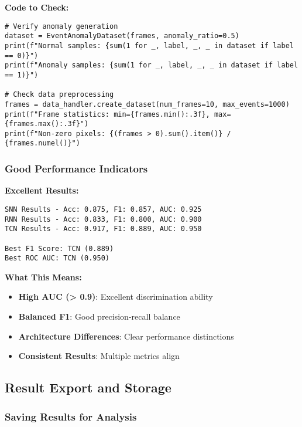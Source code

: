 \documentclass[12pt,a4paper]{article}
\begin{document}
\textbf{Code to Check:}
\begin{lstlisting}
# Verify anomaly generation
dataset = EventAnomalyDataset(frames, anomaly_ratio=0.5)
print(f"Normal samples: {sum(1 for _, label, _, _ in dataset if label == 0)}")
print(f"Anomaly samples: {sum(1 for _, label, _, _ in dataset if label == 1)}")

# Check data preprocessing
frames = data_handler.create_dataset(num_frames=10, max_events=1000)
print(f"Frame statistics: min={frames.min():.3f}, max={frames.max():.3f}")
print(f"Non-zero pixels: {(frames > 0).sum().item()} / {frames.numel()}")
\end{lstlisting}

\subsubsection{Good Performance Indicators}

\textbf{Excellent Results:}
\begin{lstlisting}
SNN Results - Acc: 0.875, F1: 0.857, AUC: 0.925
RNN Results - Acc: 0.833, F1: 0.800, AUC: 0.900
TCN Results - Acc: 0.917, F1: 0.889, AUC: 0.950

Best F1 Score: TCN (0.889)
Best ROC AUC: TCN (0.950)
\end{lstlisting}

\textbf{What This Means:}
\begin{itemize}
    \item \textbf{High AUC (> 0.9)}: Excellent discrimination ability
    \item \textbf{Balanced F1}: Good precision-recall balance
    \item \textbf{Architecture Differences}: Clear performance distinctions
    \item \textbf{Consistent Results}: Multiple metrics align
\end{itemize}

\subsection{Result Export and Storage}

\subsubsection{Saving Results for Analysis}
\end{document}
